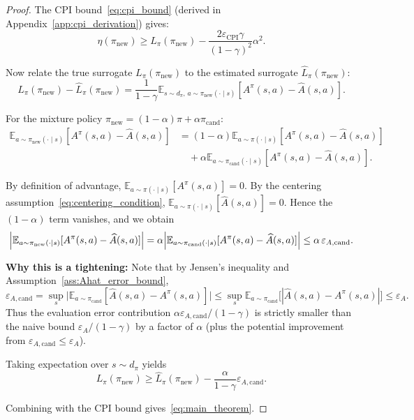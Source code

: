 \documentclass{article}
\theoremstyle{plain}
\theoremstyle{definition}
\theoremstyle{remark}
\newcommand{\E}{\mathbb{E}}
\begin{document}
\begin{proof}
The CPI bound~\eqref{eq:cpi_bound} (derived in Appendix~\ref{app:cpi_derivation}) gives:
\[
\eta(\pi_{\mathrm{new}}) \ge L_\pi(\pi_{\mathrm{new}}) - \frac{2\varepsilon_{\mathrm{CPI}}\gamma}{(1-\gamma)^2}\alpha^2.
\]

Now relate the true surrogate $L_\pi(\pi_{\mathrm{new}})$ to the estimated surrogate $\widehat{L}_\pi(\pi_{\mathrm{new}})$:
\[
L_\pi(\pi_{\mathrm{new}}) - \widehat{L}_\pi(\pi_{\mathrm{new}})
=
\frac{1}{1-\gamma}\E_{s\sim d_\pi,\, a\sim\pi_{\mathrm{new}}(\cdot\mid s)}\!\left[A^\pi(s,a) - \widehat{A}(s,a)\right].
\]

For the mixture policy $\pi_{\mathrm{new}}=(1-\alpha)\pi+\alpha\pi_{\mathrm{cand}}$:
\begin{align*}
\E_{a\sim\pi_{\mathrm{new}}(\cdot\mid s)}[A^\pi(s,a) - \widehat{A}(s,a)]
&=
(1-\alpha)\E_{a\sim\pi(\cdot\mid s)}[A^\pi(s,a) - \widehat{A}(s,a)] \\
&\quad + \alpha\E_{a\sim\pi_{\mathrm{cand}}(\cdot\mid s)}[A^\pi(s,a) - \widehat{A}(s,a)].
\end{align*}

By definition of advantage, $\E_{a\sim\pi(\cdot\mid s)}[A^\pi(s,a)]=0$.
By the centering assumption~\eqref{eq:centering_condition}, $\E_{a\sim\pi(\cdot\mid s)}[\widehat A(s,a)]=0$.
Hence the $(1-\alpha)$ term vanishes, and we obtain
\[
\Bigl|\E_{a\sim\pi_{\mathrm{new}}(\cdot\mid s)}[A^\pi(s,a) - \widehat{A}(s,a)]\Bigr|
=
\alpha\Bigl|\E_{a\sim\pi_{\mathrm{cand}}(\cdot\mid s)}[A^\pi(s,a) - \widehat{A}(s,a)]\Bigr|
\le \alpha\,\varepsilon_{A,\mathrm{cand}}.
\]

\textbf{Why this is a tightening:}
Note that by Jensen's inequality and Assumption~\ref{ass:Ahat_error_bound},
\[
\varepsilon_{A,\mathrm{cand}} 
= \sup_{s}\bigl|\E_{a\sim\pi_{\mathrm{cand}}}[\widehat{A}(s,a)-A^\pi(s,a)]\bigr|
\le \sup_{s}\E_{a\sim\pi_{\mathrm{cand}}}\bigl[|\widehat{A}(s,a)-A^\pi(s,a)|\bigr]
\le \varepsilon_A.
\]
Thus the evaluation error contribution $\alpha\varepsilon_{A,\mathrm{cand}}/(1-\gamma)$ is strictly smaller than the naive bound $\varepsilon_A/(1-\gamma)$ by a factor of $\alpha$ (plus the potential improvement from $\varepsilon_{A,\mathrm{cand}} \le \varepsilon_A$).

Taking expectation over $s\sim d_\pi$ yields
\[
L_\pi(\pi_{\mathrm{new}}) \ge \widehat{L}_\pi(\pi_{\mathrm{new}}) - \frac{\alpha}{1-\gamma}\varepsilon_{A,\mathrm{cand}}.
\]

Combining with the CPI bound gives~\eqref{eq:main_theorem}.
\end{proof}
\end{document}
